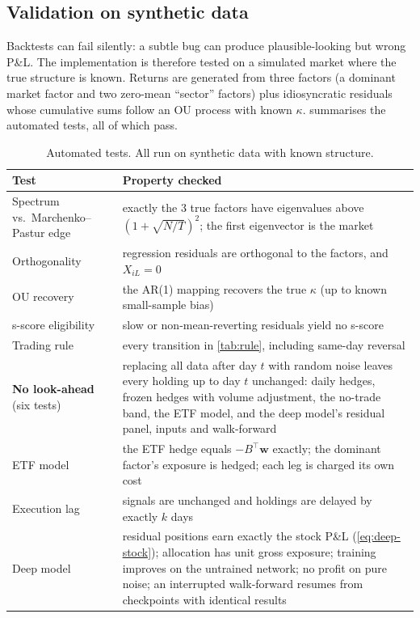 \subsection{Validation on synthetic data}
\label{sec:impl:tests}

Backtests can fail silently: a subtle bug can produce plausible-looking but wrong P\&L. The
implementation is therefore tested on a simulated market where the true structure is known.
Returns are generated from three factors (a dominant market factor and two zero-mean
``sector'' factors) plus idiosyncratic residuals whose cumulative sums follow an OU process with
known $\kappa$.  summarises the automated tests, all of which pass.

\begin{table}[ht]
\centering
\caption{Automated tests. All run on synthetic data with known structure.}
\label{tab:tests}
\begin{tabular}{p{}p{}}
\toprule
Test & Property checked \\
\midrule
Spectrum vs.\ Marchenko--Pastur edge & exactly the 3 true factors have eigenvalues above $(1+\sqrt{N/T})^2$; the first eigenvector is the market \\
Orthogonality & regression residuals are orthogonal to the factors, and $X_{iL}=0$ \\
OU recovery & the AR(1) mapping recovers the true $\kappa$ (up to known small-sample bias) \\
s-score eligibility & slow or non-mean-reverting residuals yield no s-score \\
Trading rule & every transition in \cref{tab:rule}, including same-day reversal \\
\textbf{No look-ahead} (six tests) & replacing all data after day $t$ with random noise leaves every holding up to day $t$ unchanged: daily hedges, frozen hedges with volume adjustment, the no-trade band, the ETF model, and the deep model's residual panel, inputs and walk-forward \\
ETF model & the ETF hedge equals $-B^\top \bm w$ exactly; the dominant factor's exposure is hedged; each leg is charged its own cost \\
Execution lag & signals are unchanged and holdings are delayed by exactly $k$ days \\
Deep model & residual positions earn exactly the stock P\&L (\cref{eq:deep-stock}); allocation has unit gross exposure; training improves on the untrained network; no profit on pure noise; an interrupted walk-forward resumes from checkpoints with identical results \\

\end{tabular}
\end{table}
